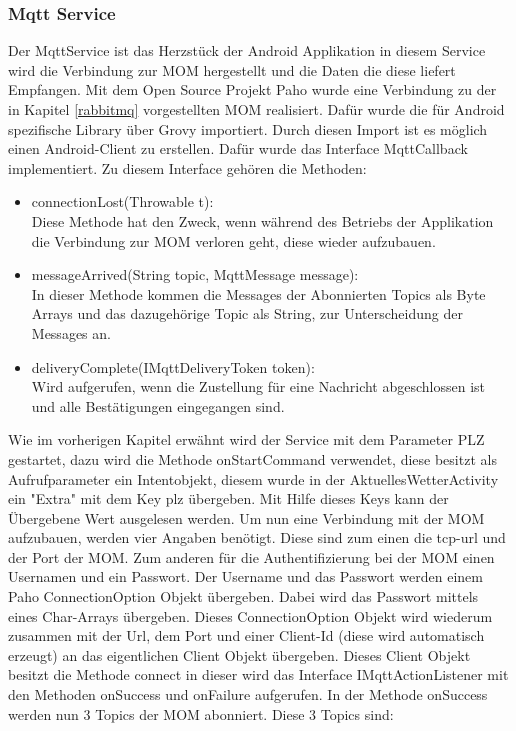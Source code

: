 \subsubsection{Mqtt Service}
\label{subsubsec:MqttService}
Der MqttService ist das Herzstück der Android Applikation in diesem Service wird die Verbindung zur MOM hergestellt und die Daten die diese liefert Empfangen.
Mit dem Open Source Projekt Paho wurde eine Verbindung zu der in Kapitel \ref{rabbitmq} vorgestellten MOM realisiert. Dafür wurde die für Android spezifische Library über Grovy importiert. Durch diesen Import ist es möglich einen Android-Client zu erstellen. Dafür wurde das Interface MqttCallback implementiert. Zu diesem Interface gehören die Methoden: 
 \begin{itemize}
\item connectionLost(Throwable t):
\\Diese Methode hat den Zweck, wenn während des Betriebs der Applikation die Verbindung zur MOM verloren geht, diese wieder aufzubauen.
\item messageArrived(String topic, MqttMessage message):
\\In dieser Methode kommen die Messages der Abonnierten Topics als Byte Arrays und das dazugehörige Topic als String, zur Unterscheidung der Messages an.
\item deliveryComplete(IMqttDeliveryToken token):
\\Wird aufgerufen, wenn die Zustellung für eine Nachricht abgeschlossen ist und alle Bestätigungen eingegangen sind.
\end{itemize}
Wie im vorherigen Kapitel erwähnt wird der Service mit dem Parameter PLZ gestartet, dazu wird die Methode onStartCommand verwendet, diese besitzt als Aufrufparameter ein Intentobjekt, diesem wurde in der AktuellesWetterActivity ein "Extra" mit dem Key plz übergeben. Mit Hilfe dieses Keys kann der Übergebene Wert ausgelesen werden. Um nun eine Verbindung mit der MOM aufzubauen, werden vier Angaben benötigt. Diese sind zum einen die tcp-url und der Port der MOM. Zum anderen für die Authentifizierung bei der MOM einen Usernamen und ein Passwort. Der Username und das Passwort werden einem Paho ConnectionOption Objekt übergeben. Dabei wird das Passwort mittels eines Char-Arrays übergeben. Dieses ConnectionOption Objekt wird wiederum zusammen mit der Url, dem Port und einer Client-Id (diese wird automatisch erzeugt) an das eigentlichen Client Objekt übergeben. Dieses Client Objekt besitzt die Methode connect in dieser wird das Interface IMqttActionListener mit den Methoden onSuccess und onFailure aufgerufen. In der Methode onSuccess werden nun 3 Topics der MOM abonniert. Diese 3 Topics sind:
